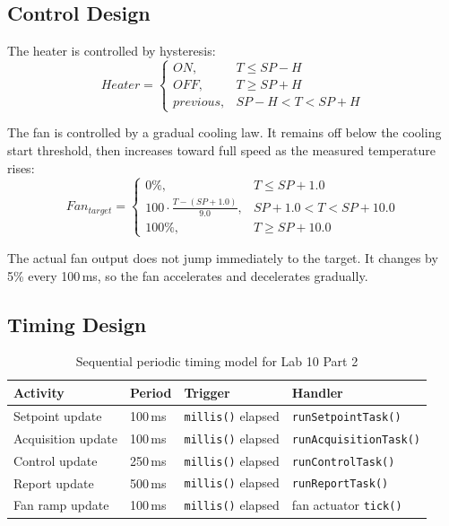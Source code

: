 \documentclass[12pt]{article}
\begin{document}
\subsection{Control Design}

\hspace{0.8cm} The heater is controlled by hysteresis:
\[
Heater =
\begin{cases}
ON, & T \leq SP - H \\
OFF, & T \geq SP + H \\
previous, & SP - H < T < SP + H
\end{cases}
\]

\hspace{0.8cm} The fan is controlled by a gradual cooling law. It remains off below the cooling start threshold, then increases toward full speed as the measured temperature rises:
\[
Fan_{target} =
\begin{cases}
0\%, & T \leq SP + 1.0 \\
100 \cdot \frac{T-(SP+1.0)}{9.0}, & SP+1.0 < T < SP+10.0 \\
100\%, & T \geq SP + 10.0
\end{cases}
\]

\hspace{0.8cm} The actual fan output does not jump immediately to the target. It changes by 5\% every 100\,ms, so the fan accelerates and decelerates gradually.

\subsection{Timing Design}

\begin{table}[H]
\centering
\begin{tabular}{llll}
\toprule
\textbf{Activity} & \textbf{Period} & \textbf{Trigger} & \textbf{Handler} \\
\midrule
Setpoint update & 100\,ms & \texttt{millis()} elapsed & \texttt{runSetpointTask()} \\
Acquisition update & 100\,ms & \texttt{millis()} elapsed & \texttt{runAcquisitionTask()} \\
Control update & 250\,ms & \texttt{millis()} elapsed & \texttt{runControlTask()} \\
Report update & 500\,ms & \texttt{millis()} elapsed & \texttt{runReportTask()} \\
Fan ramp update & 100\,ms & \texttt{millis()} elapsed & fan actuator \texttt{tick()} \\
\bottomrule
\end{tabular}
\caption{Sequential periodic timing model for Lab 10 Part 2}
\label{tab:timing}
\end{table}
\end{document}
